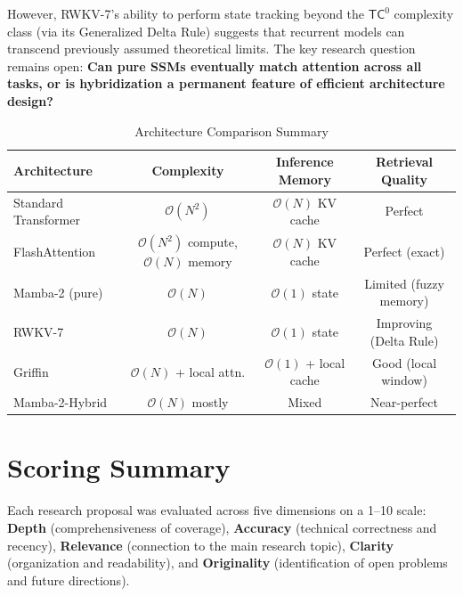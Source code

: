 \documentclass[11pt,a4paper]{article}
\begin{document}
However, RWKV-7's ability to perform state tracking beyond the $\mathsf{TC}^0$ complexity class (via its Generalized Delta Rule) suggests that recurrent models can transcend previously assumed theoretical limits. The key research question remains open: \textbf{Can pure SSMs eventually match attention across all tasks, or is hybridization a permanent feature of efficient architecture design?}

\begin{table}[H]
\centering
\caption{Architecture Comparison Summary}
\begin{tabular}{@{}lccc@{}}
\toprule
\textbf{Architecture} & \textbf{Complexity} & \textbf{Inference Memory} & \textbf{Retrieval Quality} \\
\midrule
Standard Transformer & $\mathcal{O}(N^2)$ & $\mathcal{O}(N)$ KV cache & Perfect \\
FlashAttention & $\mathcal{O}(N^2)$ compute, $\mathcal{O}(N)$ memory & $\mathcal{O}(N)$ KV cache & Perfect (exact) \\
Mamba-2 (pure) & $\mathcal{O}(N)$ & $\mathcal{O}(1)$ state & Limited (fuzzy memory) \\
RWKV-7 & $\mathcal{O}(N)$ & $\mathcal{O}(1)$ state & Improving (Delta Rule) \\
Griffin & $\mathcal{O}(N)$ + local attn. & $\mathcal{O}(1)$ + local cache & Good (local window) \\
Mamba-2-Hybrid & $\mathcal{O}(N)$ mostly & Mixed & Near-perfect \\
\bottomrule
\end{tabular}
\end{table}

\section{Scoring Summary}
\label{sec:scoring}

Each research proposal was evaluated across five dimensions on a 1--10 scale: \textbf{Depth} (comprehensiveness of coverage), \textbf{Accuracy} (technical correctness and recency), \textbf{Relevance} (connection to the main research topic), \textbf{Clarity} (organization and readability), and \textbf{Originality} (identification of open problems and future directions).
\end{document}

